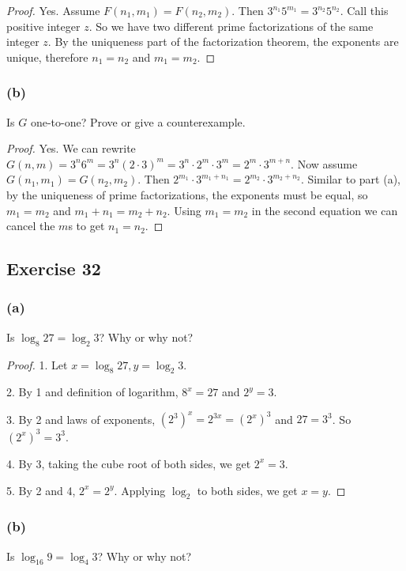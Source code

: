 \documentclass[14pt]{extarticle}
\begin{document}
\begin{proof}
    Yes. Assume \(F(n_1, m_1) = F(n_2, m_2)\). Then \(3^{n_1}5^{m_1} = 3^{n_2}5^{n_2}\). Call this positive integer $z$.
    So we have two different prime factorizations of the same integer $z$. By the uniqueness part of the factorization
    theorem, the exponents are unique, therefore \(n_1 = n_2\) and \(m_1 = m_2\).
\end{proof}

\subsubsection{(b)}
Is $G$ one-to-one? Prove or give a counterexample.

\begin{proof}
    Yes. We can rewrite \(G(n, m) = 3^n6^m = 3^n (2 \cdot 3)^m = 3^n \cdot 2^m \cdot 3^m = 2^m \cdot 3^{m+n}\). Now
    assume \(G(n_1, m_1) = G(n_2, m_2)\). Then \(2^{m_1} \cdot 3^{m_1+n_1} = 2^{m_2} \cdot 3^{m_2+n_2}\). Similar to part
    (a), by the uniqueness of prime factorizations, the exponents must be equal, so \(m_1 = m_2\) and
    \(m_1 + n_1 = m_2 + n_2\). Using \(m_1 = m_2\) in the second equation we can cancel the $m$s to get \(n_1=n_2\).
\end{proof}

\subsection{Exercise 32}
\subsubsection{(a)}
Is \(\log_8 27 = \log_2 3\)? Why or why not?

\begin{proof}
    1. Let \(x = \log_8 27, y = \log_2 3\).

    2. By 1 and definition of logarithm, \(8^x = 27\) and \(2^y = 3\).

    3. By 2 and laws of exponents, \((2^3)^x = 2^{3x} = (2^x)^3\) and \(27 = 3^3\). So \((2^x)^3 = 3^3\).

    4. By 3, taking the cube root of both sides, we get \(2^x = 3\).

    5. By 2 and 4, \(2^x = 2^y\). Applying \(\log_2\) to both sides, we get $x = y$.
\end{proof}

\subsubsection{(b)}
Is \(\log_{16} 9 = \log_4 3\)? Why or why not?
\end{document}
